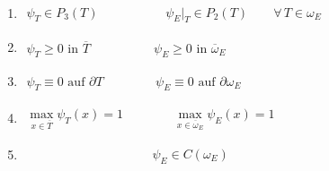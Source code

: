 \begin{lemma}[Eigenschaften]\ %
	\begin{enumerate}[label=\roman*)]
		\item $\begin{aligned}
			\psi_T\in P_3(T)
			\hspace{64pt}
			\psi_E\big|_T\in P_2(T)\qquad\forall\, T\in\omega_E
		\end{aligned}$
		\item $\begin{aligned}
			\psi_T\geq0\text{ in }\overline{T}
			\hspace{61pt}
			\psi_E\geq 0\text{ in }\overline{\omega}_E
		\end{aligned}$
		\item $\begin{aligned}
			\psi_T\equiv0\text{ auf }\partial T
			\hspace{50pt}
			\psi_E\equiv 0\text{ auf }\partial\omega_E
		\end{aligned}$
		\item $\begin{aligned}
			\max\limits_{x\in\overline{T}}\psi_T(x)=1
			\hspace{48pt}
			\max\limits_{x\in\overline{\omega}_E}\psi_E(x)=1
		\end{aligned}$
		\item $\begin{aligned}
			\hspace{120pt}
			\psi_E\in C(\omega_E)
		\end{aligned}$
	\end{enumerate}
\end{lemma}

